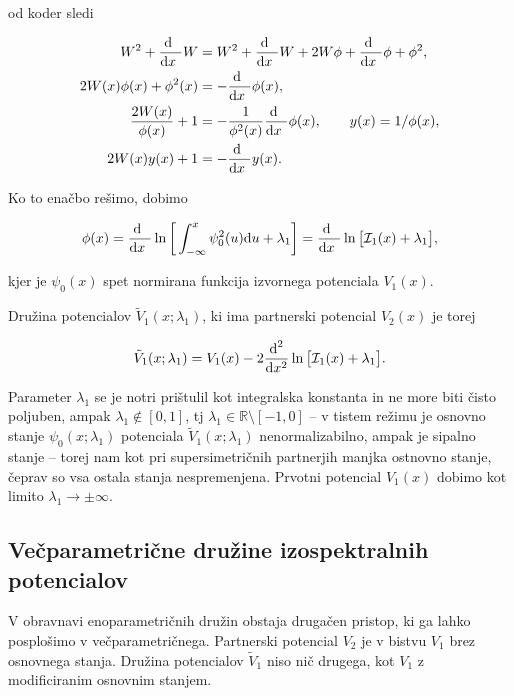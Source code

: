 \ni od koder sledi

\begin{align}
	W^2 + \frac{\text{d}^{}\ }{\text{d} x^{}\ } W &= W^2 + \frac{\text{d}^{}\ }{\text{d} x^{}\ } W + 2W\phi + \frac{\text{d}^{}\ }{\text{d} x^{}\ } \phi + \phi^2, \notag \\
	2W(x)\phi(x) + \phi^2(x) &= -\frac{\text{d}^{}\ }{\text{d} x^{}\ } \phi (x), \notag \\
	\frac{2W(x)}{\phi(x)} + 1 &= -\frac{1}{\phi^2(x)}\frac{\text{d}^{}\ }{\text{d} x^{}\ }\phi(x),\qquad y(x) = 1/\phi(x), \notag \\
	2W(x)y(x) + 1 &= -\frac{\text{d}^{}\ }{\text{d} x^{}\ } y(x).
\end{align}

\ni Ko to ena\v cbo re\v simo, dobimo

\begin{equation}
	\phi(x) = \frac{\text{d}^{}\ }{\text{d} x^{}\ } \ln \bigg[\int_{-\infty}^x \psi_0^2(u)\text{d} u + \lambda_1\bigg] =
		\frac{\text{d}^{}\ }{\text{d} x^{}\ } \ln \big[\mathcal{I}_1(x) + \lambda_1\big],
\end{equation}

\ni kjer je $\psi_0(x)$ spet normirana funkcija izvornega potenciala $V_1 (x)$.

Dru\v zina potencialov $\tilde{V}_1 (x; \lambda_1)$, ki ima partnerski potencial $V_2(x)$ je torej

\begin{equation}
	\tilde{V}_1 (x;\lambda_1) = V_1(x) - 2\frac{\text{d}^2}{\text{d} x^2}\ln\big[\mathcal{I}_1(x) + \lambda_1\big].
\end{equation}

\ni Parameter $\lambda_1$ se je notri pri\v stulil kot integralska konstanta in ne more biti \v cisto poljuben, ampak
$\lambda_1 \notin [0,1]$, tj $\lambda_1 \in \mathbb{R}\text{\textbackslash}[-1,0]$ -- v tistem re\v zimu je osnovno stanje
$\psi_0 (x; \lambda_1)$ potenciala $\tilde{V}_1(x; \lambda_1)$ nenormalizabilno, ampak je sipalno stanje -- torej
nam kot pri supersimetri\v cnih partnerjih manjka ostnovno stanje, \v ceprav so vsa ostala stanja nespremenjena.
Prvotni potencial $V_1(x)$ dobimo kot limito $\lambda_1 \to \pm \infty$.

\subsection{Ve\v cparametri\v cne dru\v zine izospektralnih potencialov}
V obravnavi enoparametri\v cnih dru\v zin obstaja druga\v cen pristop, ki ga lahko posplo\v simo v ve\v cparametri\v cnega.
Partnerski potencial $V_2$ je v bistvu $V_1$ brez osnovnega stanja.
Dru\v zina potencialov $\tilde{V}_1$ niso ni\v c drugega, kot $V_1$ z modificiranim osnovnim stanjem.


